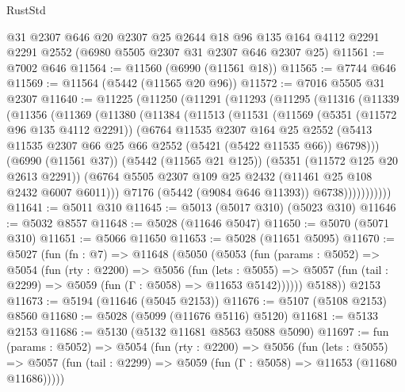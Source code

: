 \begin{lexlean}{RustStd}
\begin{coremodule}
    @31
    @2307
    @646
    @20
    @2307
    @25
    @2644
    @18
    @96
    @135
    @164
    @4112
    @2291
    @2291
    @2552
    (@6980 @5505 @2307 @31 @2307 @646 @2307 @25)
@11561 := @7002 @646
@11564 := @11560 (@6990 (@11561 @18))
@11565 := @7744 @646
@11569 := @11564 (@5442 (@11565 @20 @96))
@11572 := @7016 @5505 @31 @2307
@11640 := @11225
    (@11250
      (@11291
        (@11293
          (@11295
            (@11316
              (@11339
                (@11356
                  (@11369
                    (@11380
                      (@11384
                        (@11513
                          (@11531
                            (@11569
                              (@5351 (@11572 @96 @135 @4112 @2291))
                              (@6764
                                @11535
                                @2307
                                @164
                                @25
                                @2552
                                (@5413
                                  @11535
                                  @2307
                                  @66
                                  @25
                                  @66
                                  @2552
                                  (@5421 (@5422 @11535 @66))
                                  @6798)))
                            (@6990 (@11561 @37))
                            (@5442 (@11565 @21 @125))
                            (@5351 (@11572 @125 @20 @2613 @2291))
                            (@6764 @5505 @2307 @109 @25 @2432 (@11461 @25 @108 @2432 @6007 @6011)))
                          @7176
                          (@5442 (@9084 @646 @11393))
                          @6738)))))))))))
@11641 := @5011 @310
@11645 := @5013 (@5017 @310) (@5023 @310)
@11646 := @5032 @8557
@11648 := @5028 (@11646 @5047)
@11650 := @5070 (@5071 @310)
@11651 := @5066 @11650
@11653 := @5028 (@11651 @5095)
@11670 := @5027
    (fun (fn : @7) =>
    @11648
      (@5050
        (@5053
          (fun (params : @5052) =>
          @5054
            (fun (rty : @2200) =>
            @5056
              (fun (lets : @5055) =>
              @5057 (fun (tail : @2299) => @5059 (fun (Γ : @5058) => @11653 @5142))))))
        @5188))
    @2153
@11673 := @5194 (@11646 (@5045 @2153))
@11676 := @5107 (@5108 @2153) @8560
@11680 := @5028 (@5099 (@11676 @5116) @5120)
@11681 := @5133 @2153
@11686 := @5130 (@5132 @11681 @8563 @5088 @5090)
@11697 := fun (params : @5052) =>
  @5054
    (fun (rty : @2200) =>
    @5056
      (fun (lets : @5055) =>
      @5057 (fun (tail : @2299) => @5059 (fun (Γ : @5058) => @11653 (@11680 @11686)))))

\end{coremodule}
\end{lexlean}
